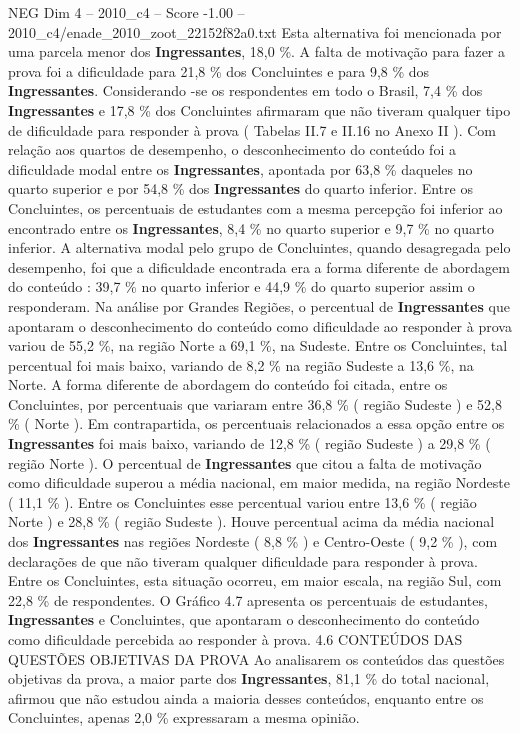 \begin{textsample}{NEG Dim 4 – 2010\_c4 – Score -1.00 – 2010\_c4/enade\_2010\_zoot\_22152f82a0.txt}
Esta alternativa foi mencionada por uma parcela menor dos \textbf{Ingressantes}, 18,0 \%.
A falta de motivação para fazer a prova foi a dificuldade para 21,8 \% dos Concluintes e para 9,8 \% dos \textbf{Ingressantes}.
Considerando -se os respondentes em todo o Brasil, 7,4 \% dos \textbf{Ingressantes} e 17,8 \% dos Concluintes afirmaram que não tiveram qualquer tipo de dificuldade para responder à prova ( Tabelas II.7 e II.16 no Anexo II ).
Com relação aos quartos de desempenho, o desconhecimento do conteúdo foi a dificuldade modal entre os \textbf{Ingressantes}, apontada por 63,8 \% daqueles no quarto superior e por 54,8 \% dos \textbf{Ingressantes} do quarto inferior.
Entre os Concluintes, os percentuais de estudantes com a mesma percepção foi inferior ao encontrado entre os \textbf{Ingressantes}, 8,4 \% no quarto superior e 9,7 \% no quarto inferior.
A alternativa modal pelo grupo de Concluintes, quando desagregada pelo desempenho, foi que a dificuldade encontrada era a forma diferente de abordagem do conteúdo : 39,7 \% no quarto inferior e 44,9 \% do quarto superior assim o responderam.
Na análise por Grandes Regiões, o percentual de \textbf{Ingressantes} que apontaram o desconhecimento do conteúdo como dificuldade ao responder à prova variou de 55,2 \%, na região Norte a 69,1 \%, na Sudeste.
Entre os Concluintes, tal percentual foi mais baixo, variando de 8,2 \% na região Sudeste a 13,6 \%, na Norte.
A forma diferente de abordagem do conteúdo foi citada, entre os Concluintes, por percentuais que variaram entre 36,8 \% ( região Sudeste ) e 52,8 \% ( Norte ).
Em contrapartida, os percentuais relacionados a essa opção entre os \textbf{Ingressantes} foi mais baixo, variando de 12,8 \% ( região Sudeste ) a 29,8 \% ( região Norte ).
O percentual de \textbf{Ingressantes} que citou a falta de motivação como dificuldade superou a média nacional, em maior medida, na região Nordeste ( 11,1 \% ).
Entre os Concluintes esse percentual variou entre 13,6 \% ( região Norte ) e 28,8 \% ( região Sudeste ).
Houve percentual acima da média nacional dos \textbf{Ingressantes} nas regiões Nordeste ( 8,8 \% ) e Centro-Oeste ( 9,2 \% ), com declarações de que não tiveram qualquer dificuldade para responder à prova.
Entre os Concluintes, esta situação ocorreu, em maior escala, na região Sul, com 22,8 \% de respondentes.
O Gráfico 4.7 apresenta os percentuais de estudantes, \textbf{Ingressantes} e Concluintes, que apontaram o desconhecimento do conteúdo como dificuldade percebida ao responder à prova. 4.6 CONTEÚDOS DAS QUESTÕES OBJETIVAS DA PROVA Ao analisarem os conteúdos das questões objetivas da prova, a maior parte dos \textbf{Ingressantes}, 81,1 \% do total nacional, afirmou que não estudou ainda a maioria desses conteúdos, enquanto entre os Concluintes, apenas 2,0 \% expressaram a mesma opinião.

\end{textsample}
